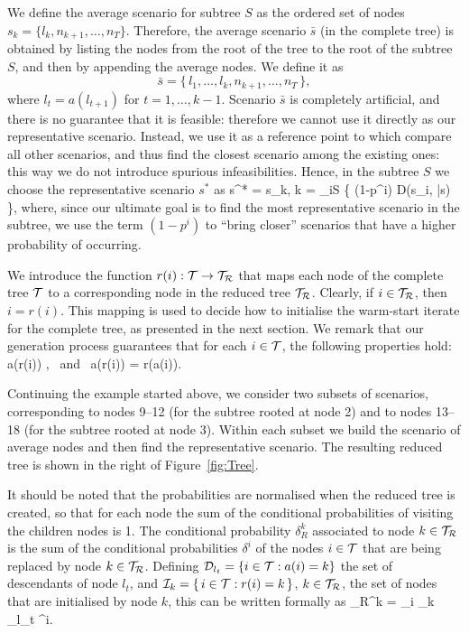 We define the average scenario for subtree $S$ as the ordered
set of nodes $s_k = \{ l_k, n_{k+1}, \ldots, n_T \}$.
Therefore, the average scenario $\bar s$ (in the complete tree) 
is obtained by listing the 
nodes from the root of the tree to the root of the subtree $S$, and 
then by appending the average nodes. We define it as
\[
\bar s = \{\, l_1, \ldots, l_k, n_{k+1}, \ldots, n_T \,\},
\]
where $l_t = a(l_{t+1})$ for $t = 1,\ldots, k-1$.
Scenario $\bar{s}$ is completely artificial, and there is no guarantee 
that it is feasible: therefore we cannot use it directly as our 
representative scenario. Instead, we use it as a reference point to 
which compare all other scenarios, and thus find the closest scenario 
among the existing ones: this way we do not introduce spurious 
infeasibilities. Hence, in the subtree $S$ we choose the 
representative scenario $s^*$ as 
%
\be  \label{repScenario}
   s^* = s_k, \quad k = \arg\min_{i\in S} \{ (1-p^i) D(s_i, \bar{s}) \},
\ee
%
where, since our ultimate goal is to find the most representative scenario in 
the subtree, we use the term $(1-p^i)$ to ``bring closer'' scenarios 
that have a higher probability of occurring.

We introduce the function $r(i): \mathcal{T} \to \mathcal{T}_\mathcal{R}$ that maps each
node of the complete tree $\mathcal{T}$ to a corresponding node in
the reduced tree $\mathcal{T}_\mathcal{R}$. Clearly, if $i \in \mathcal{T}_\mathcal{R}$, then
$i = r(i)$.
This mapping is used to decide how to initialise 
the warm-start iterate for the complete tree, as presented in the
next section. We remark that our generation process guarantees
that for each $i \in \mathcal{T}$, the following properties hold:
\be  \label{eq:ReducedTreeProperties}
  a(r(i)) \in \Rtree, \quad \mbox{ and } \quad a(r(i)) = r(a(i)).
\ee

Continuing the example started above, we consider two subsets of 
scenarios, corresponding to nodes 9--12 (for the subtree rooted at 
node 2) and to nodes 13--18 (for the subtree rooted at node 3). Within 
each subset we build the scenario of average nodes and then find the 
representative scenario.
The resulting reduced tree is shown in the right of Figure~\ref{fig:Tree}.

It should be noted that the probabilities are normalised when 
the reduced tree is created, so that for each node the sum of the
conditional probabilities of visiting the children nodes is 1.
The conditional probability $\delta_R^k$ associated to node $k \in \mathcal{T}_\mathcal{R}$
is the sum of the conditional probabilities $\delta^i$ of the nodes 
$i \in \mathcal{T}$ that are being replaced by node $k \in \mathcal{T}_\mathcal{R}$.
Defining $\mathcal{D}_{l_t} = \{ i \in \mathcal{T} : a(i) = k \}$
the set of descendants of node $l_t$, and
$\mathcal{I}_k = \{\, i \in \mathcal{T} : r(i) = k \,\}$, $k \in \mathcal{T}_\mathcal{R}$,
the set of nodes that are initialised by node $k$,
this can be written formally as
\be  \label{eq:UpdateCondProbs}
  \delta_R^k = \sum_{i \in {}_k \cap {}_{l_t}} \delta^i.
\ee

